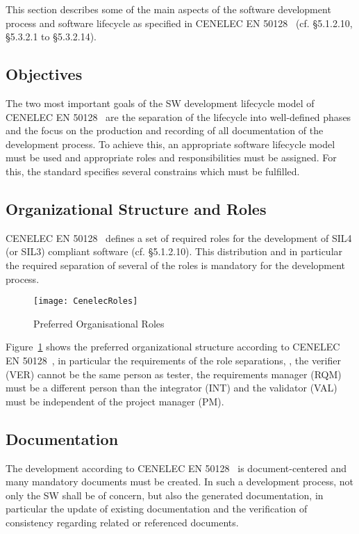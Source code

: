 
This section describes some of the main aspects of the software development
process and software lifecycle as specified in CENELEC EN 50128~\cite{EN-50128}
(cf. §5.1.2.10, §5.3.2.1 to §5.3.2.14).

\subsection{Objectives}
\label{sec:objectives}

The two most important goals of the SW development lifecycle model of CENELEC EN
50128~\cite{EN-50128} are the separation of the lifecycle into well-defined
phases and the focus on the production and recording of all documentation of the
development process. To achieve this, an appropriate software lifecycle model
must be used and appropriate roles and responsibilities must be assigned. For
this, the standard specifies several constrains which must be fulfilled.

\subsection{Organizational Structure and Roles}
\label{sec:organ-struct-roles}

CENELEC EN 50128~\cite{EN-50128} defines a set of required roles for the
development of SIL4 (or SIL3) compliant software (cf. §5.1.2.10). This
distribution and in particular the required separation of several of the roles
is mandatory for the development process.

\begin{figure}[ht]
  \centering
  \texttt{[image: CenelecRoles]}
  \caption{Preferred Organisational Roles~\cite{EN-50128}}
  \label{fig:preferred-roles}
\end{figure}

Figure~\ref{fig:preferred-roles} shows the preferred organizational structure
according to CENELEC EN 50128~\cite{EN-50128}, in particular the requirements of
the role separations, \eg, the verifier (VER) cannot be the same person as
tester, the requirements manager (RQM) must be a different person than the
integrator (INT) and the validator (VAL) must be independent of the project
manager (PM).

\subsection{Documentation}
\label{sec:documentation}

The development according to CENELEC EN 50128~\cite{EN-50128} is
document-centered and many mandatory documents must be created.  In such a
development process, not only the SW shall be of concern, but also the generated
documentation, in particular the update of existing documentation and the
verification of consistency regarding related or referenced documents.

